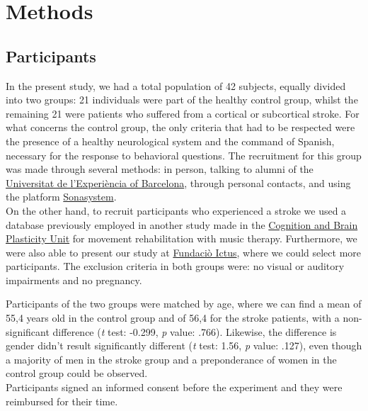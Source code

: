 \chapter{Methods}
\section{Participants}
In the present study, we had a total population of 42 subjects, equally divided into two groups: 21 individuals were part of the healthy control group, whilst the remaining 21 were patients who suffered from a cortical or subcortical stroke. For what concerns the control group, the only criteria that had to be respected were the presence of a healthy neurological system and the command of Spanish, necessary for the response to behavioral questions. The recruitment for this group was made through several methods: in person, talking to alumni of the \href{https://www.experiencia.ub.edu/ca/}{Universitat de l'Experiència of Barcelona}, through personal contacts, and using the platform \href{https://www.sona-systems.com/}{Sonasystem}. \\
On the other hand, to recruit participants who experienced a stroke we used a database previously employed in another study made in the \href{https://brainvitge.org/}{Cognition and Brain Plasticity Unit} for movement rehabilitation with music therapy. Furthermore, we were also able to present our study at \href{https://www.fundacioictus.com/}{Fundaciò Ictus}, where we could select more participants. The exclusion criteria in both groups were: no visual or auditory impairments and no pregnancy.

Participants of the two groups were matched by age, where we can find a mean of 55,4 years old in the control group and of 56,4 for the stroke patients, with a non-significant difference (\textit{t} test: -0.299, \textit{p} value: .766). 
Likewise, the difference is gender didn't result significantly different (\textit{t} test: 1.56, \textit{p} value: .127), even though a majority of men in the stroke group and a preponderance of women in the control group could be observed. \\
Participants signed an informed consent before the experiment and they were reimbursed for their time. 

